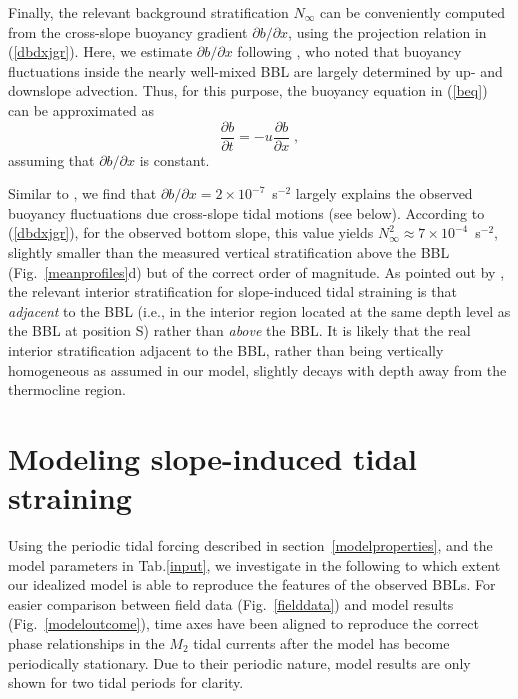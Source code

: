 Finally, the relevant background stratification $N_\infty$ can be
conveniently computed from the cross-slope buoyancy gradient $\partial
b / \partial x$, using the projection relation in (\ref{dbdxjgr}). Here,
we estimate $\partial b / \partial x$ following \cite{Endohetal2016a},
who noted that buoyancy fluctuations inside the nearly well-mixed BBL
are largely determined by up- and downslope advection. Thus, for this
purpose, the buoyancy equation in (\ref{beq}) can be approximated as
\begin{equation}
  \label{badv}
  \frac{\partial b}{\partial t} = -u \frac{\partial b}{\partial x} \; ,
\end{equation}
assuming that $\partial b / \partial x$ is constant.

Similar to \cite{Endohetal2016a}, we find that $\partial b / \partial
x=2 \times 10^{-7}$~s$^{-2}$ largely explains the observed buoyancy
fluctuations due cross-slope tidal motions (see below). According to
(\ref{dbdxjgr}), for the observed bottom slope, this value yields
$N_\infty^2 \approx 7 \times 10^{-4}$~s$^{-2}$, slightly smaller than
the measured vertical stratification above the BBL
(Fig.\ \ref{meanprofiles}d) but of the correct order of magnitude. As
pointed out by \cite{Endohetal2016a}, the relevant interior
stratification for slope-induced tidal straining is that
\emph{adjacent} to the BBL (i.e., in the interior region located at
the same depth level as the BBL at position S) rather than
\emph{above} the BBL. It is likely that the real interior
stratification adjacent to the BBL, rather than being vertically
homogeneous as assumed in our model, slightly decays with depth away
from the thermocline region.

\section{Modeling slope-induced tidal straining} \label{modelresults}

Using the periodic tidal forcing described in
section~\ref{modelproperties}, and the model parameters in
Tab.\ref{input}, we investigate in the following to which extent our
idealized model is able to reproduce the features of the observed
BBLs. For easier comparison between field data (Fig.\ \ref{fielddata})
and model results (Fig.\ \ref{modeloutcome}), time axes have been
aligned to reproduce the correct phase relationships in the $M_2$
tidal currents after the model has become periodically stationary. Due
to their periodic nature, model results are only shown for two tidal
periods for clarity.

